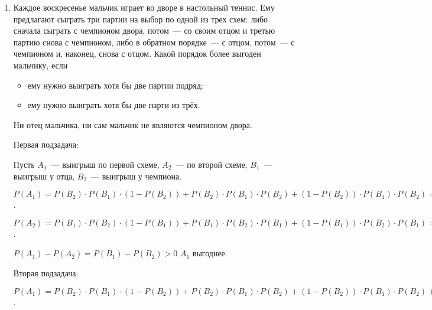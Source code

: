 \documentclass{article}
\begin{document}
\begin{enumerate}
    Выбрали места для чётных чисел и отсортировали нечётные: $\ds{P(B) = \frac{C_n^{\lfloor n / 2 \rfloor} \cdot \lfloor\frac{n}{2}\rfloor !}{n!}}$.

    $\ds{P(A) \cdot P(B) = \frac{C_n^{\lfloor n / 2 \rfloor} \cdot \lfloor\frac{n}{2}\rfloor ! \cdot C_n^{\lfloor n / 2 \rfloor} \cdot \lfloor\frac{n}{2}\rfloor !}{(n!) ^ 2}} = \frac{C_n^{\lfloor n / 2 \rfloor}}{n!} = P(A \cap B)$.

    $\ds{P(A|B) = P(A) = \frac{C_n^{\lfloor n / 2 \rfloor} \cdot \lfloor\frac{n}{2}\rfloor !}{n!}}$.

    \answer{} $\ds{\frac{C_n^{\lfloor n / 2 \rfloor} \cdot \lfloor\frac{n}{2}\rfloor !}{n!}}$.

    \item Каждое воскресенье мальчик играет во дворе в настольный теннис. Ему предлагают сыграть три партии на выбор по одной из трех схем: либо сначала сыграть с чемпионом двора, потом~--- со своим отцом и третью партию снова с чемпионом, либо в обратном порядке~--- с отцом, потом~--- с чемпионом и, наконец, снова с отцом. Какой порядок более выгоден мальчику, если
    \begin{itemize}
        \item ему нужно выиграть хотя бы две партии подряд;
        \item ему нужно выиграть хотя бы две парти из трёх.
    \end{itemize}
    Ни отец мальчика, ни сам мальчик не являются чемпионом двора.

    \solution{}

    Первая подзадача:

    Пусть $A_1$~--- выигрыш по первой схеме, $A_2$~--- по второй схеме, $B_1$~--- выигрыш у отца, $B_2$~--- выигрыш у чемпиона.

    $P(A_1) = P(B_2) \cdot P(B_1) \cdot (1 - P(B_2)) + P(B_2) \cdot P(B_1) \cdot P(B_2) + (1 - P(B_2)) \cdot P(B_1) \cdot P(B_2) = P(B_1) \cdot P(B_2) + (1 - P(B_2)) \cdot P(B_1) \cdot P(B_2)$.

    $P(A_2) = P(B_1) \cdot P(B_2) \cdot (1 - P(B_1)) + P(B_1) \cdot P(B_2) \cdot P(B_1) + (1 - P(B_1)) \cdot P(B_2) \cdot P(B_1) = P(B_1) \cdot P(B_2) + (1 - P(B_1)) \cdot P(B_2) \cdot P(B_1)$.

    $P(A_1) - P(A_2) = P(B_1) - P(B_2) > 0$ \rightarrow $A_1$ выгоднее.

    Вторая подзадача:

    $P(A_1) = P(B_2) \cdot P(B_1) \cdot (1 - P(B_2)) + P(B_2) \cdot P(B_1) \cdot P(B_2) + (1 - P(B_2)) \cdot P(B_1) \cdot P(B_2) + P(B_2) \cdot (1 - P(B_1)) \cdot P(B_2)$.


\end{enumerate}
\end{document}
